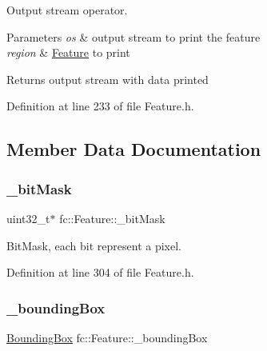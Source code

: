 Output stream operator. 


\begin{DoxyParams}{Parameters}
{\em os} & output stream to print the feature \\
\hline
{\em region} & \hyperlink{classfc_1_1Feature}{Feature} to print \\
\hline
\end{DoxyParams}
\begin{DoxyReturn}{Returns}
output stream with data printed 
\end{DoxyReturn}


Definition at line 233 of file Feature.\+h.



\subsection{Member Data Documentation}
\mbox{\label{classfc_1_1Feature_acab3e3e0a9d67af174f19ec7f8e3668f}} 
\subsubsection{\texorpdfstring{\+\_\+bit\+Mask}{\_bitMask}}
{\footnotesize\ttfamily uint32\+\_\+t$\ast$ fc\+::\+Feature\+::\+\_\+bit\+Mask\hspace{0.3cm}{\ttfamily [private]}}



Bit\+Mask, each bit represent a pixel. 



Definition at line 304 of file Feature.\+h.

\mbox{\label{classfc_1_1Feature_ac6bc52c10118373d56c6789dcffc59fa}} 
\subsubsection{\texorpdfstring{\+\_\+bounding\+Box}{\_boundingBox}}
{\footnotesize\ttfamily \hyperlink{classfc_1_1BoundingBox}{Bounding\+Box} fc\+::\+Feature\+::\+\_\+bounding\+Box\hspace{0.3cm}{\ttfamily [private]}}




